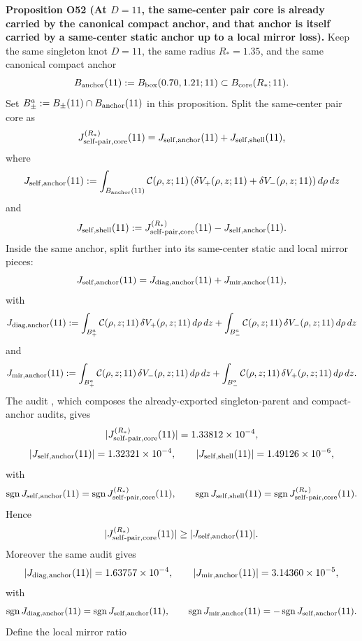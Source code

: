 \documentclass[aps,prd,onecolumn,notitlepage,nofootinbib,superscriptaddress,11pt,floatfix]{revtex4-2}
\begin{document}
\medskip\noindent\textbf{Proposition O52 (At \(D=11\), the same-center pair core is already carried by the canonical compact anchor, and that anchor is itself carried by a same-center static anchor up to a local mirror loss).}
Keep the same singleton knot \(D=11\), the same radius \(R_\ast=1.35\), and the same canonical compact anchor
\[
B_{\rm anchor}(11):=B_{\rm box}(0.70,1.21;11)\subset B_{\rm core}(R_\ast;11).
\]
Set \(B_\pm^a:=B_\pm(11)\cap B_{\rm anchor}(11)\) in this proposition.
Split the same-center pair core as
\[
J_{{\rm self\text{-}pair},{\rm core}}^{(R_\ast)}(11)
=
J_{{\rm self},\rm anchor}(11)+J_{{\rm self},\rm shell}(11),
\]
where
\[
J_{{\rm self},\rm anchor}(11)
:=
\int_{B_{\rm anchor}(11)}
\mathcal C(\rho,z;11)\,(\delta V_+(\rho,z;11)+\delta V_-(\rho,z;11))\,d\rho\,dz
\]
and
\[
J_{{\rm self},\rm shell}(11)
:=
J_{{\rm self\text{-}pair},{\rm core}}^{(R_\ast)}(11)-J_{{\rm self},\rm anchor}(11).
\]
Inside the same anchor, split further into its same-center static and local mirror pieces:
\[
J_{{\rm self},\rm anchor}(11)
=
J_{{\rm diag},\rm anchor}(11)+J_{{\rm mir},\rm anchor}(11),
\]
with
\[
J_{{\rm diag},\rm anchor}(11)
:=
\int_{B_+^a} \mathcal C(\rho,z;11)\,\delta V_+(\rho,z;11)\,d\rho\,dz
+
\int_{B_-^a} \mathcal C(\rho,z;11)\,\delta V_-(\rho,z;11)\,d\rho\,dz
\]
and
\[
J_{{\rm mir},\rm anchor}(11)
:=
\int_{B_+^a} \mathcal C(\rho,z;11)\,\delta V_-(\rho,z;11)\,d\rho\,dz
+
\int_{B_-^a} \mathcal C(\rho,z;11)\,\delta V_+(\rho,z;11)\,d\rho\,dz.
\]
The audit ,
which composes the already-exported singleton-parent and compact-anchor audits, gives
\[
|J_{{\rm self\text{-}pair},{\rm core}}^{(R_\ast)}(11)|=1.33812\times10^{-4},
\]
\[
|J_{{\rm self},\rm anchor}(11)|=1.32321\times10^{-4},
\qquad
|J_{{\rm self},\rm shell}(11)|=1.49126\times10^{-6},
\]
with
\[
\operatorname{sgn} J_{{\rm self},\rm anchor}(11)
=
\operatorname{sgn} J_{{\rm self\text{-}pair},{\rm core}}^{(R_\ast)}(11),
\qquad
\operatorname{sgn} J_{{\rm self},\rm shell}(11)
=
\operatorname{sgn} J_{{\rm self\text{-}pair},{\rm core}}^{(R_\ast)}(11).
\]
Hence
\[
|J_{{\rm self\text{-}pair},{\rm core}}^{(R_\ast)}(11)|
\ge
|J_{{\rm self},\rm anchor}(11)|.
\]
Moreover the same audit gives
\[
|J_{{\rm diag},\rm anchor}(11)|=1.63757\times10^{-4},
\qquad
|J_{{\rm mir},\rm anchor}(11)|=3.14360\times10^{-5},
\]
with
\[
\operatorname{sgn} J_{{\rm diag},\rm anchor}(11)
=
\operatorname{sgn} J_{{\rm self},\rm anchor}(11),
\qquad
\operatorname{sgn} J_{{\rm mir},\rm anchor}(11)
=
-\operatorname{sgn} J_{{\rm self},\rm anchor}(11).
\]
Define the local mirror ratio
\end{document}
